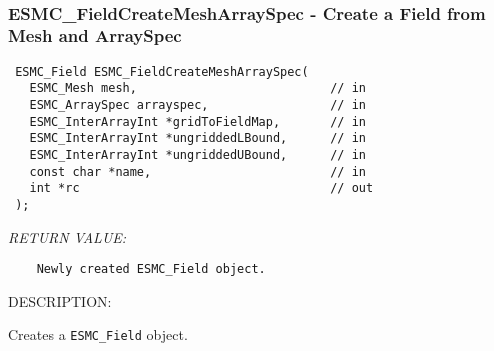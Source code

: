  
\mbox{}\hrulefill\ 
 
\subsubsection [ESMC\_FieldCreateMeshArraySpec] {ESMC\_FieldCreateMeshArraySpec - Create a Field from Mesh and ArraySpec}


  
\begin{verbatim} ESMC_Field ESMC_FieldCreateMeshArraySpec(
   ESMC_Mesh mesh,                           // in
   ESMC_ArraySpec arrayspec,                 // in
   ESMC_InterArrayInt *gridToFieldMap,       // in
   ESMC_InterArrayInt *ungriddedLBound,      // in
   ESMC_InterArrayInt *ungriddedUBound,      // in
   const char *name,                         // in
   int *rc                                   // out
 );
 \end{verbatim}{\em RETURN VALUE:}
\begin{verbatim}    Newly created ESMC_Field object.\end{verbatim}
{\sf DESCRIPTION:\\ }


  
    Creates a {\tt ESMC\_Field} object.
  
